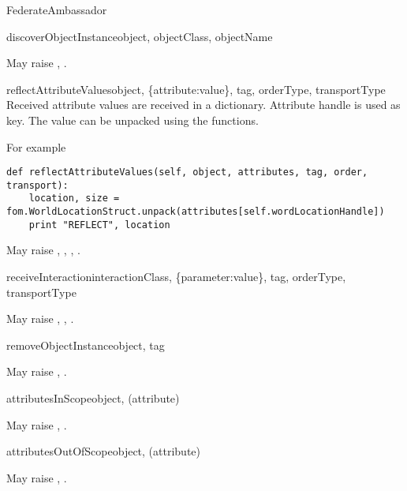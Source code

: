 \begin{classdesc}{FederateAmbassador}{}
\begin{methoddesc}{discoverObjectInstance}{object, objectClass, objectName}

May raise
,
.
\end{methoddesc}

\begin{methoddesc}{reflectAttributeValues}{object, \{attribute:value\}, tag, orderType, transportType}
Received attribute values are received in a dictionary. Attribute handle is used as key.
The value can be unpacked using the  functions.

For example
\begin{verbatim}
def reflectAttributeValues(self, object, attributes, tag, order, transport):
    location, size = fom.WorldLocationStruct.unpack(attributes[self.wordLocationHandle])
    print "REFLECT", location
\end{verbatim}

May raise
,
,
,
.
\end{methoddesc}

\begin{methoddesc}{receiveInteraction}{interactionClass, \{parameter:value\}, tag, orderType, transportType}

May raise
,
,
.
\end{methoddesc}

\begin{methoddesc}{removeObjectInstance}{object, tag}

May raise
,
.
\end{methoddesc}

\begin{methoddesc}{attributesInScope}{object, (attribute)}

May raise
,
.
\end{methoddesc}

\begin{methoddesc}{attributesOutOfScope}{object, (attribute)}

May raise
,
.
\end{methoddesc}


\end{classdesc}
